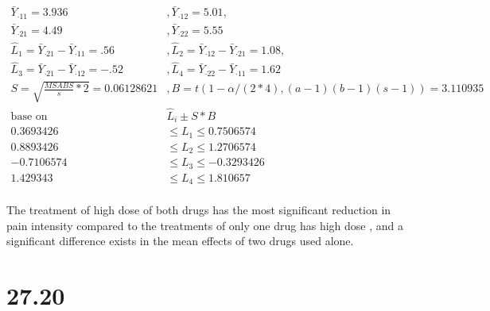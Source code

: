\documentclass{article}\usepackage[]{graphicx}\usepackage[]{color}
\begin{document}
\begin{enumerate}[(a)]
\begin{displaymath}
\begin{split}
\bar{Y}_{\cdot 11} =3.936 &, \bar{Y}_{\cdot 12} = 5.01 ,\\
\bar{Y}_{\cdot 21} =4.49 &, \bar{Y}_{\cdot 22} = 5.55 \\
\hat{L}_1 = \bar{Y}_{\cdot 21}-\bar{Y}_{\cdot 11} = .56 &,  
\hat{L}_2 = \bar{Y}_{\cdot 12}-\bar{Y}_{\cdot 21}= 1.08 ,\\ 
\hat{L}_3 = \bar{Y}_{\cdot 21}-\bar{Y}_{\cdot 12}=-.52 &,
\hat{L}_4 = \bar{Y}_{\cdot 22}-\bar{Y}_{\cdot 11} =1.62 \\
S = \sqrt{\frac{MSABS}{s}*2} = 0.06128621 &, B = t(1-\alpha/(2*4), (a-1)(b-1)(s-1))=3.110935\\
\text{base on} &\hat{L}_i \pm S*B\\
0.3693426 & \leq L_1 \leq 0.7506574  \\
0.8893426 &\leq L_2 \leq 1.2706574\\
-0.7106574 &\leq L_3 \leq -0.3293426 \\
1.429343 & \leq L_4 \leq 1.810657 \\
\end{split}
\end{displaymath}

\qquad The treatment of high dose of both drugs has the most significant reduction in pain intensity compared to the treatments of only one drug has high dose , and a significant difference exists in the mean effects of two drugs used alone.

\end{enumerate}

\section{27.20}
\end{document}
